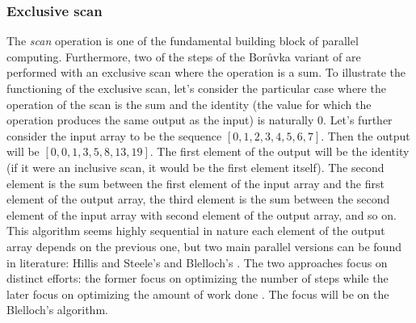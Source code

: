 \subsubsection{Exclusive scan}
\label{sub:scan}


The \emph{scan} operation is one of the fundamental building block of parallel computing. 
Furthermore, two of the steps of the Borůvka variant of \cite{Sousa2015} are performed with an exclusive scan where the operation is a sum. 
To illustrate the functioning of the exclusive scan, let's consider the particular case where the operation of the scan is the sum and the identity (the value for which the operation produces the same output as the input) is naturally $0$.
Let's further consider the input array to be the sequence $[0,1,2,3,4,5,6,7]$.
Then the output will be $[0,0,1,3,5,8,13,19]$.
The first element of the output will be the identity (if it were an inclusive scan, it would be the first element itself).
The second element is the sum between the first element of the input array and the first element of the output array, the third element is the sum between the second element of the input array with second element of the output array, and so on.
This algorithm seems highly sequential in nature each element of the output array depends on the previous one, but two main parallel versions can be found in literature: Hillis and Steele's \cite{Hillis1986} and Blelloch's \cite{Blelloch1990}. 
The two approaches focus on distinct efforts: the former focus on optimizing the number of steps \cite{Hillis1986} while the later focus on optimizing the amount of work done \cite{Blelloch1990}.
The focus will be on the Blelloch's algorithm.

